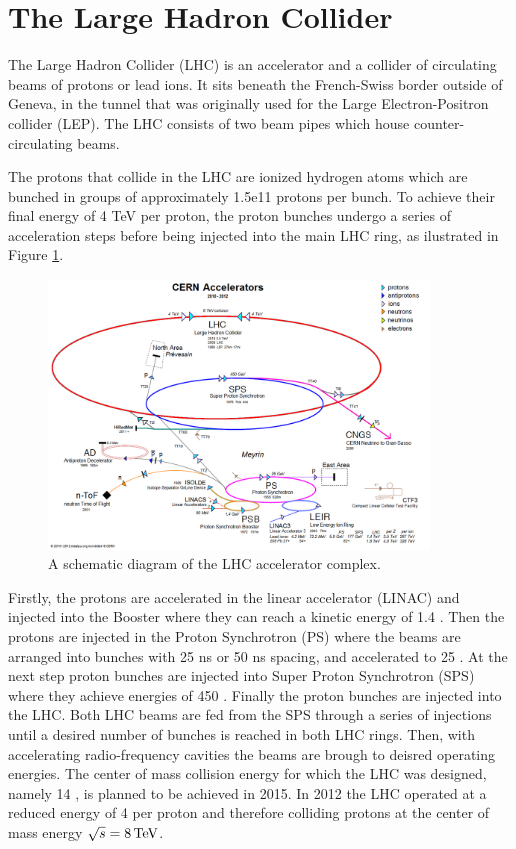 \section{The Large Hadron Collider}

The Large Hadron Collider (LHC) is an accelerator and a collider of circulating beams of protons
or lead ions. 
It sits beneath the French-Swiss border outside of Geneva, in the tunnel that was originally used
for the Large Electron-Positron collider (LEP). 
 The LHC consists of two beam pipes which house counter-circulating beams.

The protons that collide in the LHC are ionized hydrogen atoms which are bunched in groups
of approximately 1.5e11 protons per bunch. To achieve their final energy of 4 TeV per proton,
the proton bunches undergo a series of acceleration steps before being injected into
the main LHC ring, as ilustrated in Figure \ref{fig:accelerators}.

\begin{figure}[htbp]
\centering
\includegraphics[width=0.9\textwidth]{plots/intro/accelerators.png}
\caption{A schematic diagram of the LHC accelerator complex.\label{fig:accelerators}}
\end{figure}

Firstly, the protons are accelerated in the linear accelerator (LINAC) and injected into 
the Booster where they can reach a kinetic energy of 1.4 \GeV. Then the protons are injected
in the Proton Synchrotron (PS) where the beams are arranged into bunches
with 25 ns or 50 ns spacing, and accelerated to 25 \GeV. At the next step
 proton bunches are injected
into Super Proton Synchrotron (SPS) where they achieve energies of 450 \GeV. Finally the proton
bunches are injected into the LHC. Both LHC beams are fed from the SPS through a series of injections
until a desired number of bunches is reached in both LHC rings. Then, with accelerating 
radio-frequency cavities the beams are brough to deisred operating energies.
The center of mass collision energy for which the LHC was designed, namely 14 \TeV,
 is planned to be achieved in 2015.
In 2012 the LHC operated at a reduced energy of 4 \TeV per proton
and therefore colliding protons at the
center of mass energy $\sqrt{s} = 8 \,\text{Te\hspace{-.08em}V}$.

